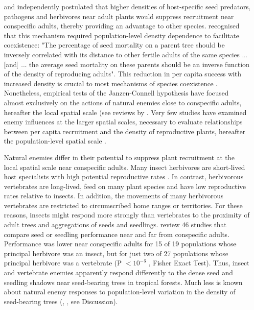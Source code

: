 \documentclass[b5paper,justified]{tufte-book} %
\begin{document}
\begin{fullwidth}
\citet{Janzen1970} and \citet{Connell1971} independently postulated that higher densities of host-specific seed predators, pathogens and herbivores near adult plants would suppress recruitment near conspecific adults, thereby providing an advantage to other species. \citet{Janzen1970} recognised that this mechanism required population-level density dependence to facilitate coexistence: "The percentage of seed mortality on a parent tree should be inversely correlated with its distance to other fertile adults of the same species ... [and] ... the average seed mortality on these parents should be an inverse function of the density of reproducing adults". This reduction in per capita
success with increased density is crucial to most mechanisms of species coexistence \citep{Chesson2000}. Nonetheless, empirical tests of the Janzen-Connell hypothesis have focused almost exclusively on the actions of natural enemies close to conspecific adults, hereafter the local spatial scale (see reviews by \citealt{Clark1984, Hammond1998, Carson2008}. Very few studies have examined enemy influences at the larger spatial scales, necessary to evaluate relationships between per capita recruitment and the density of reproductive plants, hereafter the population-level spatial scale \citep{Schupp1992}.

Natural enemies differ in their potential to suppress plant recruitment at the local spatial scale near conspecific adults. Many insect herbivores are short-lived host specialists with high potential reproductive rates \citep{Janzen1970}. In contrast, herbivorous vertebrates are long-lived, feed on many plant species and have low reproductive rates relative to insects. In addition, the movements of many herbivorous vertebrates are restricted to circumscribed home ranges or territories. For these reasons, insects might respond more strongly than vertebrates to the proximity of adult trees and aggregations of seeds and seedlings. \citet{Hammond1998} review 46 studies that compare seed or seedling performance near and far from conspecific adults. Performance was lower near conspecific adults for 15 of 19 populations whose principal herbivore was an insect, but for just two of 27 populations whose principal herbivore was a vertebrate (P $< 10^{-6}$ , Fisher Exact Test). Thus, insect and vertebrate enemies apparently respond differently to the dense seed and seedling shadows near seed-bearing trees in tropical forests. Much less is known about natural enemy responses to population-level variation in the density of seed-bearing trees (\citealt{Schupp1992}, \citealt{Lewis2008}, see Discussion).


\end{fullwidth}
\end{document}
